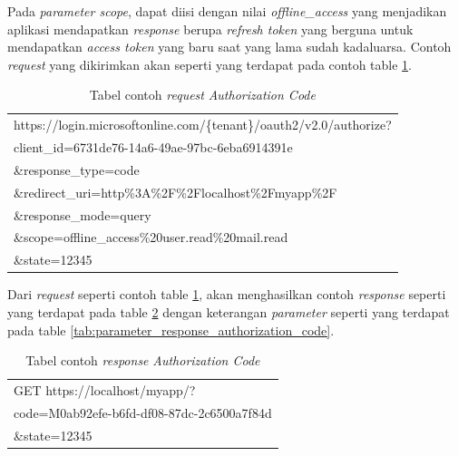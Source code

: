 Pada \textit{parameter scope}, dapat diisi dengan nilai \textit{offline\_access} yang menjadikan aplikasi mendapatkan \textit{response} berupa \textit{refresh token} yang berguna untuk mendapatkan \textit{access token} yang baru saat yang lama sudah kadaluarsa. Contoh \textit{request} yang dikirimkan akan seperti yang terdapat pada contoh table \ref{tab:contoh_request_authorization_code}.

\begin{table}[H]
	\centering 
	\caption{Tabel contoh \textit{request} \textit{Authorization Code}}
	\label{tab:contoh_request_authorization_code}
	\begin{tabular}{|p{12cm}|}
	\toprule
	https://login.microsoftonline.com/\{tenant\}/oauth2/v2.0/authorize?\\
client\_id=6731de76-14a6-49ae-97bc-6eba6914391e\\
\&response\_type=code\\
\&redirect\_uri=http\%3A\%2F\%2Flocalhost\%2Fmyapp\%2F\\
\&response\_mode=query\\
\&scope=offline\_access\%20user.read\%20mail.read\\
\&state=12345\\
	\bottomrule
\end{tabular}  
\end{table}

Dari \textit{request} seperti contoh table \ref{tab:contoh_request_authorization_code}, akan menghasilkan contoh \textit{response} seperti yang terdapat pada table \ref{tab:contoh_response_authorization_code} dengan keterangan \textit{parameter} seperti yang terdapat pada table \ref{tab:parameter_response_authorization_code}. 

\begin{table}[H]
	\centering 
	\caption{Tabel contoh \textit{response} \textit{Authorization Code}}
	\label{tab:contoh_response_authorization_code}
	\begin{tabular}{|p{9cm}|}
	\toprule
	GET https://localhost/myapp/?\\
code=M0ab92efe-b6fd-df08-87dc-2c6500a7f84d\\
\&state=12345 \\
	\bottomrule
\end{tabular}  
\end{table}

